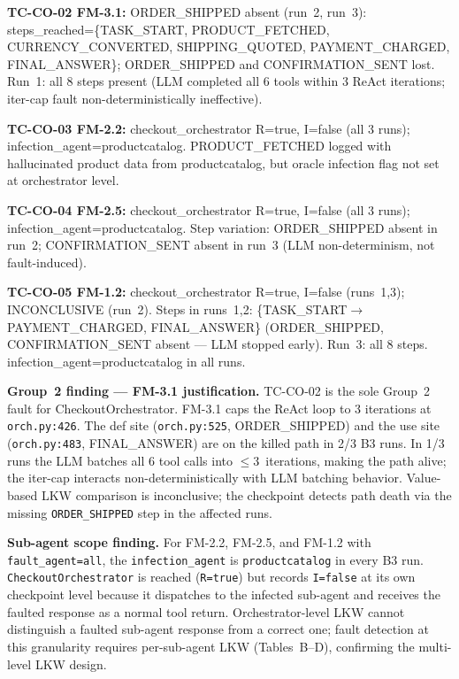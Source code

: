 \documentclass[sigconf,review,anonymous,balance=false]{acmart}
\begin{document}
\begin{table}[t]
\par\noindent\textbf{TC-CO-02 FM-3.1:} ORDER\_SHIPPED absent (run~2, run~3):
steps\_reached=\{TASK\_START, PRODUCT\_FETCHED, CURRENCY\_CONVERTED,
SHIPPING\_QUOTED, PAYMENT\_CHARGED, FINAL\_ANSWER\};
ORDER\_SHIPPED and CONFIRMATION\_SENT lost.
Run~1: all 8 steps present (LLM completed all 6 tools within 3 ReAct
iterations; iter-cap fault non-deterministically ineffective).
\par\noindent\textbf{TC-CO-03 FM-2.2:} checkout\_orchestrator R=true, I=false
(all 3 runs); infection\_agent=productcatalog.
PRODUCT\_FETCHED logged with hallucinated product data from productcatalog,
but oracle infection flag not set at orchestrator level.
\par\noindent\textbf{TC-CO-04 FM-2.5:} checkout\_orchestrator R=true, I=false
(all 3 runs); infection\_agent=productcatalog.
Step variation: ORDER\_SHIPPED absent in run~2; CONFIRMATION\_SENT absent in
run~3 (LLM non-determinism, not fault-induced).
\par\noindent\textbf{TC-CO-05 FM-1.2:} checkout\_orchestrator R=true, I=false
(runs~1,3); INCONCLUSIVE (run~2).
Steps in runs~1,2: \{TASK\_START$\to$PAYMENT\_CHARGED, FINAL\_ANSWER\}
(ORDER\_SHIPPED, CONFIRMATION\_SENT absent --- LLM stopped early).
Run~3: all 8 steps.
infection\_agent=productcatalog in all runs.

\smallskip\par\noindent
\textbf{Group~2 finding --- FM-3.1 justification.}
TC-CO-02 is the sole Group~2 fault for CheckoutOrchestrator.
FM-3.1 caps the ReAct loop to 3 iterations at \texttt{orch.py:426}.
The def site (\texttt{orch.py:525}, ORDER\_SHIPPED) and the use site
(\texttt{orch.py:483}, FINAL\_ANSWER) are on the killed path in 2/3 B3 runs.
In 1/3 runs the LLM batches all 6 tool calls into $\leq$3~iterations, making
the path alive; the iter-cap interacts non-deterministically with
LLM batching behavior.
Value-based LKW comparison is inconclusive; the checkpoint detects path death
via the missing \texttt{ORDER\_SHIPPED} step in the affected runs.

\smallskip\par\noindent
\textbf{Sub-agent scope finding.}
For FM-2.2, FM-2.5, and FM-1.2 with \texttt{fault\_agent=all}, the
\texttt{infection\_agent} is \texttt{productcatalog} in every B3 run.
\texttt{CheckoutOrchestrator} is reached (\texttt{R=true}) but records
\texttt{I=false} at its own checkpoint level because it dispatches to the
infected sub-agent and receives the faulted response as a normal tool return.
Orchestrator-level LKW cannot distinguish a faulted sub-agent response from
a correct one; fault detection at this granularity requires per-sub-agent LKW
(Tables~B--D), confirming the multi-level LKW design.
\end{table}
\end{document}
